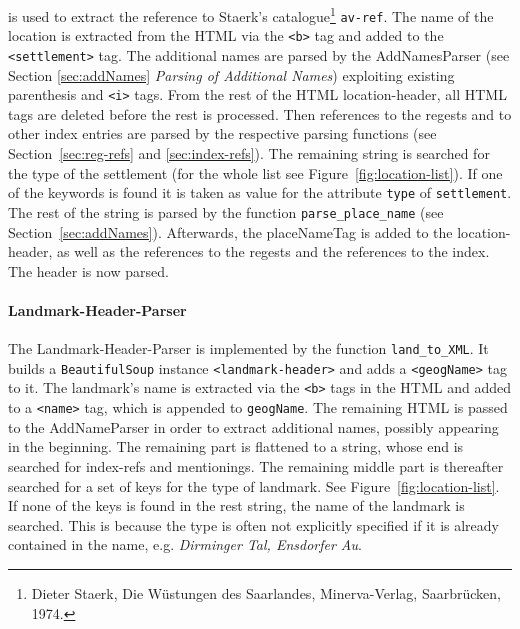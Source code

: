 is used to extract the reference to Staerk's catalogue\footnote{Dieter
  Staerk, Die Wüstungen des Saarlandes, Minerva-Verlag, Saarbrücken,
  1974.} \texttt{av-ref}. The name of the location is extracted from
the HTML via the \texttt{<b>} tag and added to the
\texttt{<settlement>} tag. The additional names are parsed by the
AddNamesParser (see Section \ref{sec:addNames} \textit{Parsing of
  Additional Names}) exploiting existing parenthesis and \texttt{<i>}
tags. From the rest of the HTML location-header, all HTML tags are
deleted before the rest is processed. Then references to the regests
and to other index entries are parsed by the respective parsing
functions (see Section~\ref{sec:reg-refs} and \ref{sec:index-refs}).
The remaining string is searched for the type of the settlement (for
the whole list see Figure~\ref{fig:location-list}). If one of the
keywords is found it is taken as value for the attribute \texttt{type}
of \texttt{settlement}. The rest of the string is parsed by the
function \texttt{parse\_place\_name} (see Section~\ref{sec:addNames}).
Afterwards, the placeNameTag is added to the location-header, as well
as the references to the regests and the references to the index. The
header is now parsed.

\paragraph{Landmark-Header-Parser}
The Landmark-Header-Parser is implemented by the function
\texttt{land\_to\_XML}. It builds a \texttt{BeautifulSoup} instance
\texttt{<landmark-header>} and adds a \texttt{<geogName>} tag to it.
The landmark's name is extracted via the \texttt{<b>} tags in the HTML
and added to a \texttt{<name>} tag, which is appended to
\texttt{geogName}. The remaining HTML is passed to the AddNameParser
in order to extract additional names, possibly appearing in the
beginning. The remaining part is flattened to a string, whose end is
searched for index-refs and mentionings. The remaining middle part is
thereafter searched for a set of keys for the type of landmark. See
Figure~\ref{fig:location-list}. If none of the keys is found in the
rest string, the name of the landmark is searched. This is because the
type is often not explicitly specified if it is already contained in
the name, e.g. \textit{Dirminger Tal, Ensdorfer Au}.

